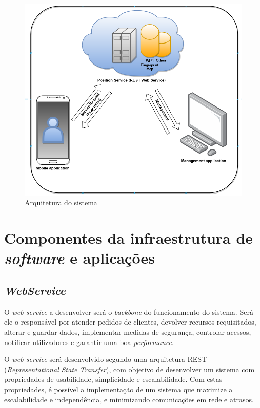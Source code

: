 \documentclass[12pt]{article} %
\begin{document}
\begin{figure}[!htbp]
		\includegraphics[width=15cm]{arquitetura.png}
		\centering
		\caption{Arquitetura do sistema}

	\end{figure}



\pagebreak

\section{Componentes da infraestrutura de \textit{software} e aplicações}
\subsection{\textit{WebService}}

O \textit{web service} a desenvolver será o \textit{backbone} do funcionamento do sistema. Será ele o responsável por atender pedidos de clientes, devolver recursos requisitados, alterar e guardar dados, implementar medidas de segurança, controlar acessos, notificar utilizadores e garantir uma boa \textit{performance}.\par
O \textit{web service} será desenvolvido segundo uma arquitetura REST (\textit{Representational State Transfer}), com objetivo de desenvolver um sistema com propriedades de usabilidade, simplicidade e escalabilidade. Com estas propriedades, é possível a implementação de um sistema que maximize a escalabilidade e independência, e minimizando comunicações em rede e atrasos.
\end{document}
